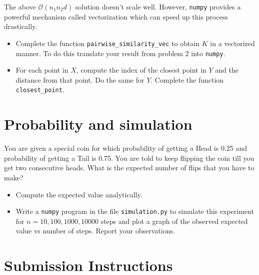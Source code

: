 \documentclass{article}
\begin{document}
The above $\mathcal{O}(n_1 n_2 d)$ solution doesn't scale well. However, \texttt{numpy} provides a powerful mechanism called vectorization which can speed up this process drastically. \\

\begin{itemize}[leftmargin=*]
\item Complete the function \texttt{pairwise\_similarity\_vec} to obtain $K$ in a vectorized manner. To do this translate your result from problem 2 into \texttt{numpy}.

\item For each point in $X$, compute the index of the closest point in $Y$ and the distance from that point. Do the same for $Y$. Complete the function
\texttt{closest\_point}.
\end{itemize}


\section{Probability and simulation}

You are given a special coin for which probability of getting a Head is 0.25 and probability of getting a Tail is 0.75. You are told to keep flipping the coin till you get two consecutive heads. What is the expected number of flips that you have to make? 
\begin{itemize}[leftmargin=*]
    \item Compute the expected value  analytically.
    \item Write a \texttt{numpy} program in the file \texttt{simulation.py} to simulate this experiment for $n=10,100,1000,10000$ steps and plot a graph of the observed expected value vs number of steps. Report your observations.
\end{itemize}

\section*{Submission Instructions}
\end{document}

